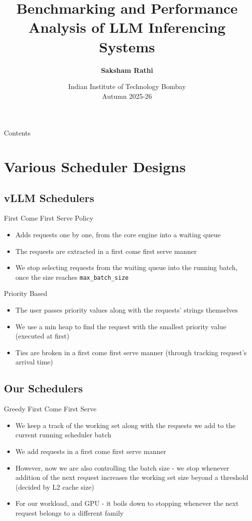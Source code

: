 \documentclass[Serif, 10pt, brown]{beamer}
\title[{Systems for LLMs}]{\sc Benchmarking and Performance Analysis of LLM Inferencing Systems}
\author[\ul{Saksham Rathi}]{{\textbf{Saksham Rathi}}}
\institute[UTD]{\sc\small Systems for LLMs\\ Under Prof. Mythili Vutukuru}
\date[UCI]{Indian Institute of Technology Bombay \\ Autumn 2025-26}
\theoremstyle{example}
\theoremstyle{plain}
\begin{document}
\frame{\titlepage}

\begin{frame}{Contents}
	\tableofcontents
\end{frame}

\section{Various Scheduler Designs}
\subsection{vLLM Schedulers}
\begin{frame}{First Come First Serve Policy}
    \begin{itemize}
        \item Adds requests one by one, from the core engine into a waiting queue
        \item The requests are extracted in a first come first serve manner
        \item We stop selecting requests from the waiting queue into the running batch, once the size reaches \texttt{max\_batch\_size}
    \end{itemize}
\end{frame}

\begin{frame}{Priority Based}
    \begin{itemize}
        \item The user passes priority values along with the requests' strings themselves
        \item We use a min heap to find the request with the smallest priority value (executed at first)
        \item Ties are broken in a first come first serve manner (through tracking request's arrival time)
    \end{itemize}
\end{frame}

\subsection{Our Schedulers}
\begin{frame}{Greedy First Come First Serve}
    \begin{itemize}
        \item We keep a track of the working set along with the requests we add to the current running scheduler batch
        \item We add requests in a first come first serve manner
        \item However, now we are also controlling the batch size - we stop whenever addition of the next request increases the working set size beyond a threshold (decided by L2 cache size)
        \item For our workload, and GPU - it boils down to stopping whenever the next request belongs to a different family
    \end{itemize}
\end{frame}
\end{document}
